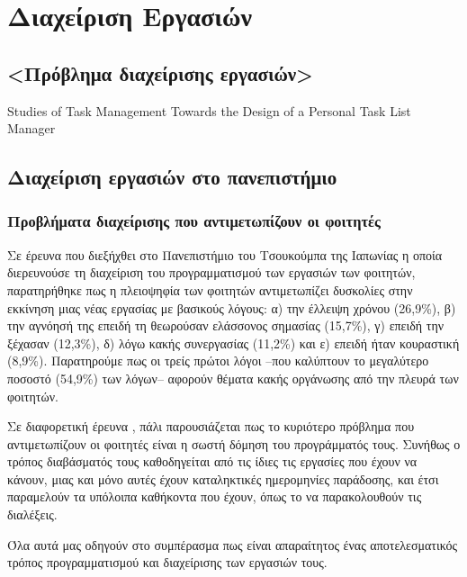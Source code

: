 \chapter{Διαχείριση Εργασιών}

    \section{<Πρόβλημα διαχείρισης εργασιών>}
        Studies of Task Management Towards the Design of a Personal Task List Manager

    \section{Διαχείριση εργασιών στο πανεπιστήμιο}
        \subsection{Προβλήματα διαχείρισης που αντιμετωπίζουν οι φοιτητές}
            Σε έρευνα \cite{Fukuzawa2015} που διεξήχθει στο Πανεπιστήμιο του Τσουκούμπα της Ιαπωνίας η οποία διερευνούσε τη διαχείριση του προγραμματισμού των εργασιών των φοιτητών,
                παρατηρήθηκε πως η πλειοψηφία των φοιτητών αντιμετωπίζει δυσκολίες στην εκκίνηση μιας νέας εργασίας με βασικούς λόγους:
                α) την έλλειψη χρόνου (26,9\%), β) την αγνόησή της επειδή τη θεωρούσαν ελάσσονος σημασίας (15,7\%), γ) επειδή την ξέχασαν (12,3\%),
                δ) λόγω κακής συνεργασίας (11,2\%) και ε) επειδή ήταν κουραστική (8,9\%).
            Παρατηρούμε πως οι τρείς πρώτοι λόγοι --που καλύπτουν το μεγαλύτερο ποσοστό (54,9\%) των λόγων-- αφορούν θέματα κακής οργάνωσης από την πλευρά των φοιτητών.

            Σε διαφορετική έρευνα \cite{Trujillo2020}, πάλι παρουσιάζεται πως το κυριότερο πρόβλημα που αντιμετωπίζουν οι φοιτητές είναι η σωστή δόμηση του προγράμματός τους.
            Συνήθως ο τρόπος διαβάσματός τους καθοδηγείται από τις ίδιες τις εργασίες που έχουν να κάνουν, μιας και μόνο αυτές έχουν καταληκτικές ημερομηνίες παράδοσης,
                και έτσι παραμελούν τα υπόλοιπα καθήκοντα που έχουν, όπως το να παρακολουθούν τις διαλέξεις.

            Όλα αυτά μας οδηγούν στο συμπέρασμα πως είναι απαραίτητος ένας αποτελεσματικός τρόπος προγραμματισμού και διαχείρισης των εργασιών τους.

